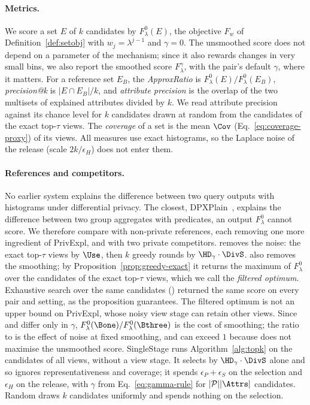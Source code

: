 \paragraph{Metrics.}
We score a set $E$ of $k$ candidates by $F^0_\lambda(E)$, the objective $F_w$ of Definition~\ref{def:setobj} with $w_j=\lambda^{j-1}$ and $\gamma=0$.
The unsmoothed score does not depend on a parameter of the mechanism; since it also rewards changes in very small bins, we also report the smoothed score $F^\gamma_\lambda$, with the pair's default $\gamma$, where it matters.
For a reference set $E_B$, the \emph{ApproxRatio} is $F^0_\lambda(E)/F^0_\lambda(E_B)$, \emph{precision@k} is $|E\cap E_B|/k$, and \emph{attribute precision} is the overlap of the two multisets of explained attributes divided by $k$.
We read attribute precision against its chance level for $k$ candidates drawn at random from the candidates of the exact top-$\tau$ views.
The \emph{coverage} of a set is the mean $\Cov$ (Eq.~\eqref{eq:coverage-proxy}) of its views.
All measures use exact histograms, so the Laplace noise of the release (scale $2k/\epsilon_H$) does not enter them.

\paragraph{References and competitors.}
No earlier system explains the difference between two query outputs with histograms under differential privacy.
The closest, DPXPlain~\cite{TaoGMR22}, explains the difference between two group aggregates with predicates, an output $F^0_\lambda$ cannot score.
We therefore compare with non-private references, each removing one more ingredient of \textsf{PrivExpl}, and with two private competitors.
\Bone{} removes the noise: the exact top-$\tau$ views by $\Use$, then $k$ greedy rounds by $\HD_\gamma\cdot\DivS$.
\Bthree{} also removes the smoothing; by Proposition~\ref{prop:greedy-exact} it returns the maximum of $F^0_\lambda$ over the candidates of the exact top-$\tau$ views, which we call the \emph{filtered optimum}.
Exhaustive search over the same candidates (\Btwo{}) returned the same score on every pair and setting, as the proposition guarantees.
The filtered optimum is not an upper bound on \textsf{PrivExpl}, whose noisy view stage can retain other views.
Since \Bone{} and \Bthree{} differ only in $\gamma$, $F^0_\lambda(\Bone)/F^0_\lambda(\Bthree)$ is the cost of smoothing; the ratio to \Bone{} is the effect of noise at fixed smoothing, and can exceed $1$ because \Bone{} does not maximise the unsmoothed score.
\textsf{SingleStage} runs Algorithm~\ref{alg:topk} on the candidates of all views, without a view stage.
It selects by $\HD_\gamma\cdot\DivS$ alone and so ignores representativeness and coverage; it spends $\epsilon_P+\epsilon_S$ on the selection and $\epsilon_H$ on the release, with $\gamma$ from Eq.~\eqref{eq:gamma-rule} for $|\mathcal{P}||\Attrs|$ candidates.
\textsf{Random} draws $k$ candidates uniformly and spends nothing on the selection.

